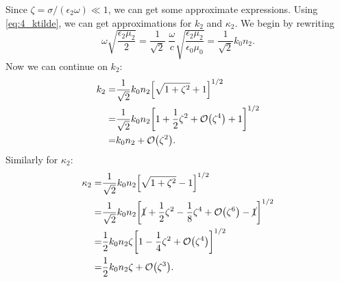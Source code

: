\documentclass[11pt,letter, swedish, english
]{article}
\begin{document}
Since $\zeta=\sigma/(\epsilon_2\omega)\ll1$, we can get some
approximate expressions. Using \eqref{eq:4_ktilde}, we can get
approximations for $k_2$ and $\kappa_2$. We begin by rewriting
\begin{equation}
\omega\sqrt{\frac{\epsilon_2\mu_2}{2}} 
=\frac{1}{\sqrt{2}}\; \frac{\omega}{c} 
\sqrt{\frac{\epsilon_2\mu_2}{\epsilon_0\mu_0}}
=\frac{1}{\sqrt{2}}k_0n_2.
\end{equation}
Now we can continue on $k_2$:
\begin{equation}
\begin{aligned}
k_2 =& \frac{1}{\sqrt{2}}k_0n_2
\qty[\sqrt{1+\zeta^2}+1]^{1/2}\\
=& \frac{1}{\sqrt{2}}k_0n_2
\qty[1+\frac{1}{2}\zeta^2+\order{\zeta^4}+1]^{1/2}\\
=& k_0n_2  +\order{\zeta^2}.
\end{aligned}
\end{equation}
Similarly for $\kappa_2$:
\begin{equation}
\begin{aligned}
\kappa_2 =& \frac{1}{\sqrt{2}}k_0n_2
\qty[\sqrt{1+\zeta^2}-1]^{1/2}\\
=& \frac{1}{\sqrt{2}}k_0n_2
\qty[\cancel{1}+\frac{1}{2}\zeta^2-\frac{1}{8}\zeta^4+
\order{\zeta^6}-\cancel{1}]^{1/2}\\
=& \frac{1}{2}k_0n_2\zeta
\qty[1-\frac{1}{4}\zeta^2+\order{\zeta^4}]^{1/2}\\
=& \frac{1}{2}k_0n_2\zeta +\order{\zeta^3}.
\end{aligned}
\end{equation}
\end{document}
